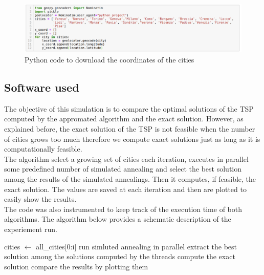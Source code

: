 \documentclass{article}
\begin{document}
\begin{figure}[H]
\includegraphics[scale=0.42]{download_dataset.png} 
\centering
\caption{Python code to download the coordinates of the cities}
\end{figure}

\subsection{Software used}
The objective of this simulation is to compare the optimal solutions of the TSP computed by the appromated algorithm and the exact solution.
However, as explained before, the exact solution of the TSP is not feasible when the number of cities grows too much therefore we compute exact solutions just as long as it is computationally feasible. \\
The algorithm select a growing set of cities each iteration, executes in parallel some predefined number of simulated annealing and select the best solution among the results of the simulated annealings. Then it computes, if feasible, the exact solution. The values are saved at each iteration and then are plotted to easily show the results.\\
The code was also instrumented to keep track of the execution time of both algorithms.
The algorithm  below provides a schematic description of the experiement run. 
\begin{algorithm}[H]
    \begin{algorithmic}[1]
       	\State  cities $\leftarrow$ all\_cities[0:i]
       		\State run simluted annealing in parallel
       	\EndFor 
       	\State extract the best solution among the solutions computed by the threads
       		\State compute the exact solution
       	\EndIf
       	\State compare the results by plotting them
       \EndFor
       \EndFunction
\end{algorithmic}
\end{algorithm}
\end{document}
